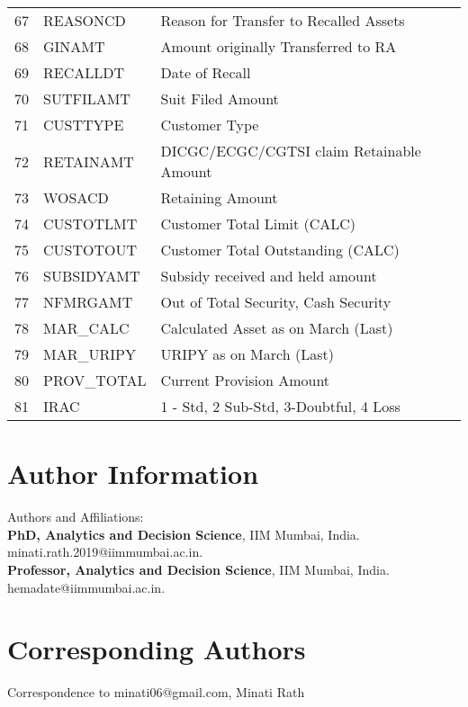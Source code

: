 \documentclass[a4paper]{article}
\begin{document}
\begin{longtable}{|c|l|p{8cm}|}
		67 & REASONCD & Reason for Transfer to Recalled Assets \\
		68 & GINAMT & Amount originally Transferred to RA \\
		69 & RECALLDT & Date of Recall \\
		70 & SUTFILAMT & Suit Filed Amount \\
		71 & CUSTTYPE & Customer Type \\
		72 & RETAINAMT & DICGC/ECGC/CGTSI claim Retainable Amount \\
		73 & WOSACD & Retaining Amount \\
		74 & CUSTOTLMT & Customer Total Limit (CALC) \\
		75 & CUSTOTOUT & Customer Total Outstanding (CALC) \\
		76 & SUBSIDYAMT & Subsidy received and held amount \\
		77 & NFMRGAMT & Out of Total Security, Cash Security \\
		78 & MAR\_CALC & Calculated Asset as on March (Last) \\
		79 & MAR\_URIPY & URIPY as on March (Last) \\
		80 & PROV\_TOTAL & Current Provision Amount \\
		81 & IRAC & 1 - Std, 2 Sub-Std, 3-Doubtful, 4 Loss \\
	\end{longtable}
	
	

\section*{Author Information}
Authors and Affiliations:\\
\textbf{PhD, Analytics and  Decision Science}, IIM Mumbai, India. {minati.rath.2019@iimmumbai.ac.in}.\\
\textbf{Professor, Analytics and Decision Science}, IIM Mumbai, India.
{hemadate@iimmumbai.ac.in}.
\section*{Corresponding Authors}
Correspondence to {minati06@gmail.com}{, Minati Rath} 
	
\end{document}
